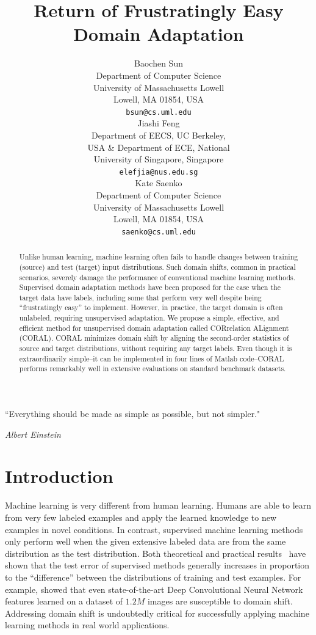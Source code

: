 \documentclass[letterpaper]{article}
\title{Return of Frustratingly Easy Domain Adaptation}
\author{
Baochen Sun\\
Department of Computer Science\\
University of Massachusetts Lowell\\
Lowell, MA 01854, USA \\
\texttt{bsun@cs.uml.edu} \\
\And
Jiashi Feng\\
Department of EECS, UC Berkeley,\\
USA \& Department of ECE, National\\
University of Singapore,  Singapore\\
\texttt{elefjia@nus.edu.sg} \\
\And
Kate Saenko\\
Department of Computer Science\\
University of Massachusetts Lowell\\
Lowell, MA 01854, USA \\
\texttt{saenko@cs.uml.edu} \\
}
\begin{document}
\nocopyright %
\frenchspacing
\maketitle

\begin{abstract}
Unlike human learning, machine learning often fails to handle changes between training (source) and test (target) input distributions. Such domain shifts, common in practical scenarios, severely damage the performance of conventional machine learning methods.
Supervised domain adaptation methods have been proposed for the case when the target data have labels, including some that perform very well despite being ``frustratingly easy'' to implement. However, in practice, the target domain is often unlabeled, requiring unsupervised adaptation.
We propose a simple, effective, and efficient method for unsupervised domain adaptation called CORrelation ALignment (CORAL). CORAL minimizes domain shift by aligning the second-order statistics of source and target distributions, without requiring any target labels.
Even though it is extraordinarily simple--it can be implemented in four lines of Matlab code--CORAL performs remarkably well in extensive evaluations on standard benchmark datasets.
\end{abstract}

\epigraph{``Everything should be made as simple as possible, but not simpler."}{\textit{Albert Einstein}}
\section{Introduction}
\label{sec:intro}
Machine learning is very different from human learning. Humans are able to learn from very few labeled examples and apply the learned knowledge to new examples in novel conditions. In contrast, supervised machine learning methods only perform well when the given extensive labeled data are from the same distribution as the test distribution. Both theoretical \cite{bendavid,Blitzer07Biographies} and practical results~\cite{saenko2010adapting,efros-cvpr11} have shown that the test error of supervised methods generally increases in proportion to the ``difference'' between the distributions of training and test examples. For example, \citeauthor{decaf}  showed that even state-of-the-art Deep Convolutional Neural Network features learned on a  dataset of $1.2M$ images are susceptible to domain shift.
Addressing domain shift is undoubtedly critical for successfully applying machine learning methods in real world applications.
\end{document}
